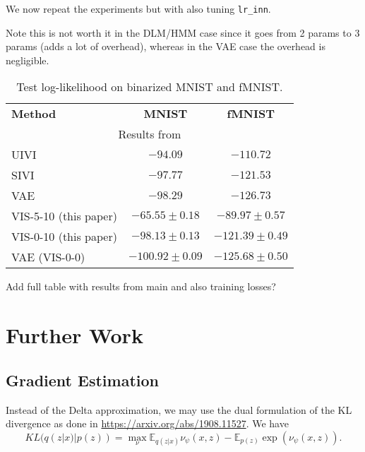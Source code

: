 We now repeat the experiments but with also tuning \texttt{lr\_inn}.

Note this is not worth it in the DLM/HMM case since it goes from 2 params to 3 params (adds a lot of overhead), whereas in the VAE case the overhead is negligible.



\begin{table}[!ht]
\centering
\caption{Test log-likelihood on binarized MNIST and fMNIST.}\label{tbl:iwhvae}
\begin{tabular}{lcc}
\cline{1-3}
\textbf{Method}   & \textbf{MNIST}                             & \textbf{fMNIST}   \\ \cline{1-3}
\multicolumn{3}{c}{\small Results from \parencite{pmlr-v89-titsias19a}}       \\
    UIVI          & $-94.09$ &  $-110.72$ \\
    SIVI          & $-97.77$ &  $-121.53$ \\
    VAE          & $-98.29$ &  $-126.73$ \\
    \cline{1-3}
    VIS-5-10 (this paper)     & $\bm{-65.55 \pm 0.18}$ & $\bm{-89.97 \pm 0.57}$  \\
    VIS-0-10 (this paper)     & $-98.13 \pm 0.13$ & $-121.39 \pm 0.49$  \\
    VAE (VIS-0-0)              & $-100.92 \pm 0.09$ & $-125.68 \pm 0.50$ \\
\end{tabular}
\end{table}

Add full table with results from main and also training losses?
\fi

\iffalse
\section{Further Work}

\subsection{Gradient Estimation}

Instead of the Delta approximation, we may use the dual formulation of the KL divergence as done in \url{https://arxiv.org/abs/1908.11527}. We have 
$$
KL(q(z|x) | p(z)) = \max_{\nu} \mathbb{E}_{q(z|x)} \nu_{\psi}(x,z) -  \mathbb{E}_{p(z)} \exp (\nu_{\psi}(x,z)).
$$

